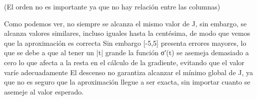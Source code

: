 \documentclass{article}
\begin{document}
\begin{enumerate}[label=\roman*., widest=ii]
  (El orden no es importante ya que no hay relación entre las columnas)

  Como podemos ver, no siempre se alcanza el mismo valor de J, sin embargo, se alcanza valores similares, incluso iguales hasta la centésima, de modo que vemos que la aproximación es correcta
  Sin embargo [-5,5] presenta errores mayores, lo que se debe a que al tener un |t| grande la función σ′(t) se asemeja demasiado a cero lo que afecta a la resta en el cálculo de la gradiente, evitando que el valor varíe adecuadamente
  El descenso no garantiza alcanzar el mínimo global de J, ya que no es seguro que la aproximación llegue a ser exacta, sin importar cuanto se asemeje al valor esperado.

\end{enumerate}
\despueslista

\end{document}
